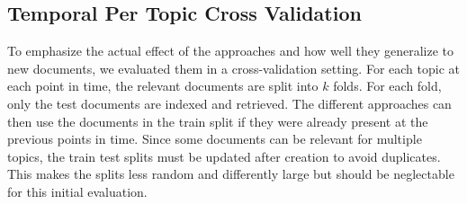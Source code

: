 \subsection{Temporal Per Topic Cross Validation}
To emphasize the actual effect of the approaches and how well they generalize to new documents, we evaluated them in a cross-validation setting. For each topic at each point in time, the relevant documents are split into $k$ folds. For each fold, only the test documents are indexed and retrieved. The different approaches can then use the documents in the train split if they were already present at the previous points in time. Since some documents can be relevant for multiple topics, the train test splits must be updated after creation to avoid duplicates. This makes the splits less random and differently large but should be neglectable for this initial evaluation.


